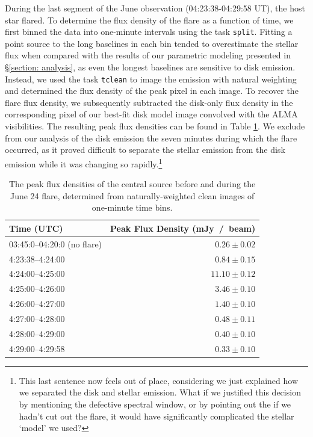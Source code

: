 \documentclass[modern]{aastex62}
\begin{document}
During the last segment of the June observation (04:23:38-04:29:58 UT), the host star flared. 
To determine the flux density of the flare as a function of time, we first binned the data into one-minute intervals using the task \texttt{split}. 
Fitting a point source to the long baselines in each bin tended to overestimate the stellar flux when compared with the results of our parametric modeling presented in \S \ref{section: analysis}, as even the longest baselines are sensitive to disk emission.
Instead, we used the task \texttt{tclean} to image the emission with natural weighting and determined the flux density of the peak pixel in each image. 
To recover the flare flux density, we subsequently subtracted the disk-only flux density in the corresponding pixel of our best-fit disk model image convolved with the ALMA visibilities.
The resulting peak flux densities can be found in Table \ref{tab:flare fluxes}.
We exclude from our analysis of the disk emission the seven minutes during which the flare occurred, as it proved difficult to separate the stellar emission from the disk emission while it was changing so rapidly.\footnote{This last sentence now feels out of place, considering we just explained how we separated the disk and stellar emission. What if we justified this decision by mentioning the defective spectral window, or by pointing out the if we hadn't cut out the flare, it would have significantly complicated the stellar `model' we used?}

\begin{table}	
  \centering
  \begin{tabular}{lr}
    \toprule
    Time (UTC) & Peak Flux Density (\si{mJy / beam}) \\
    \midrule
    03:45:0--04:20:0 (no flare) & $0.26 \pm 0.02$\\
  	4:23:38--4:24:00 & $0.84  \pm 0.15$ \\
  	4:24:00--4:25:00 & $11.10 \pm 0.12$ \\
  	4:25:00--4:26:00 & $3.46  \pm 0.10$ \\
  	4:26:00--4:27:00 & $1.40  \pm 0.10$ \\
  	4:27:00--4:28:00 & $0.48  \pm 0.11$ \\
  	4:28:00--4:29:00 & $0.40  \pm 0.10$ \\
  	4:29:00--4:29:58 & $0.33  \pm 0.10$\\
    \bottomrule
  \end{tabular}
	\caption{The peak flux densities of the central source before and during the June 24 flare, determined from naturally-weighted clean images of one-minute time bins.}
  \label{tab:flare fluxes}
\end{table}
\end{document}
